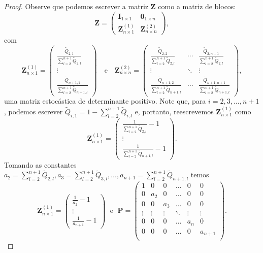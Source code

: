 \documentclass[twoside,openright,titlepage,numbers=noenddot,headinclude,  lineheaders footinclude=true,cleardoublepage=empty,
                                BCOR=5mm,paper=a4,fontsize=12pt ]{scrbook}
\theoremstyle{definition}
\begin{document}
\begin{proof}
Observe que podemos escrever a matriz $\mathbf{Z}$ como a 
matriz de blocos:
\[
\mathbf{Z} = 
\begin{pmatrix}
\mathbf{I}_{1 \times 1} & \mathbf{0}_{1 \times n} \\
\mathbf{Z}_{n \times 1}^{(1)} & \mathbf{Z}_{n \times n}^{(2)}
\end{pmatrix}
,
\]
com 
\[
\mathbf{Z}_{n \times 1}^{(1)} = 
\begin{pmatrix}
\frac{\widetilde{Q}_{2,1}}{\sum_{l = 2}^{n+1} \widetilde{Q}_{2,l}}
\\
\vdots
\\
\frac{\widetilde{Q}_{n+1,1}}
{\sum_{l = 2}^{n+1} \widetilde{Q}_{n+1,l}}
\end{pmatrix}
\quad \text{e} \quad
\mathbf{Z}_{n \times n}^{(2)} = 
\begin{pmatrix}
\frac{\widetilde{Q}_{2,2}}{\sum_{l = 2}^{n+1} \widetilde{Q}_{2,l}}
& \cdots &
\frac{\widetilde{Q}_{2,n+1}}
{\sum_{l = 2}^{n+1} \widetilde{Q}_{2,l}}
\\
 \vdots & \ddots & \vdots\\
\frac{\widetilde{Q}_{n+1,2}}
{\sum_{l = 2}^{n+1} \widetilde{Q}_{n+1,l}}
& \cdots &
\frac{\widetilde{Q}_{n+1,n+1}}
{\sum_{l = 2}^{n+1} \widetilde{Q}_{n+1,l}}
\end{pmatrix},
\]
uma matriz estocástica de determinante positivo.
Note que, para $i=2, 3, \ldots, n+1$, podemos escrever
$\widetilde{Q}_{i,1} = 1 - \sum_{l = 2}^{n+1} \widetilde{Q}_{i,l}$
e, portanto, reescrevemos 
$\mathbf{Z}_{n \times 1}^{(1)}$ como
\[
\mathbf{Z}_{n \times 1}^{(1)} = 
\begin{pmatrix}
\frac{1}{\sum_{l = 2}^{n+1} \widetilde{Q}_{2,l}} - 1
\\
\vdots
\\
\frac{1}
{\sum_{l = 2}^{n+1} \widetilde{Q}_{n+1,l}} - 1
\end{pmatrix}
.
\]
Tomando as constantes $a_2 = \sum_{l = 2}^{n+1} \widetilde{Q}_{2,l},
a_3 = \sum_{l = 2}^{n+1} \widetilde{Q}_{3,l}, \ldots, 
a_{n+1} = \sum_{l = 2}^{n+1} \widetilde{Q}_{n+1,l}$ temos
\[
\mathbf{Z}_{n \times 1}^{(1)} = 
\begin{pmatrix}
\frac{1}{a_2} - 1
\\
\vdots
\\
\frac{1}
{a_{n+1}} - 1
\end{pmatrix}
\; \text{ e } \;
\mathbf{P} =
\begin{pmatrix}
1 & 0   & 0   & \ldots & 0 & 0\\
0 & a_2 & 0   & \ldots & 0 & 0\\
0 & 0   & a_3 & \ldots & 0 & 0\\
\vdots & \vdots   & \vdots   & \ddots & \vdots & \vdots\\
0 & 0   & 0 & \ldots & a_n & 0\\
0 & 0   & 0 & \ldots & 0 & a_{n+1}\\
\end{pmatrix}
.
\]


\end{proof}
\end{document}
